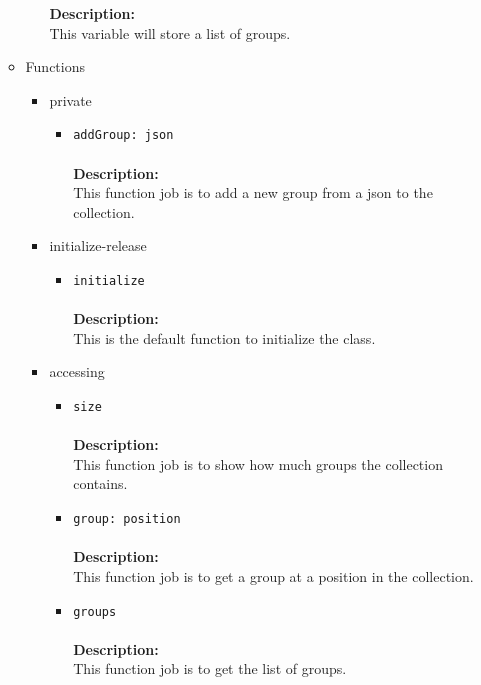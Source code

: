 \begin{itemize}
\begin{itemize}
\begin{itemize}
     \textbf{Description:}\\
     This variable will store a list of groups.
\end{itemize}


\item Functions
\label{sec-1-4-2-9-2}%
\begin{itemize}

\item private
\label{sec-1-4-2-9-2-1}%
\begin{itemize}
\item \verb~addGroup: json~\\\\
\textbf{Description:}\\
      This function job is to add a new group from a json to the collection.\\
\end{itemize}


\item initialize-release
\label{sec-1-4-2-9-2-2}%
\begin{itemize}
\item \verb~initialize~\\\\
\textbf{Description:}\\
      This is the default function to initialize the class.
\end{itemize}


\item accessing
\label{sec-1-4-2-9-2-3}%
\begin{itemize}
\item \verb~size~\\\\
\textbf{Description:}\\
      This function job is to show how much groups the collection contains.\\
\item \verb~group: position~\\\\
\textbf{Description:}\\
      This function job is to get a group at a position in the collection.\\
\item \verb~groups~\\\\
\textbf{Description:}\\
      This function job is to get the list of groups.
\end{itemize}


\end{itemize}
\end{itemize}
\end{itemize}
